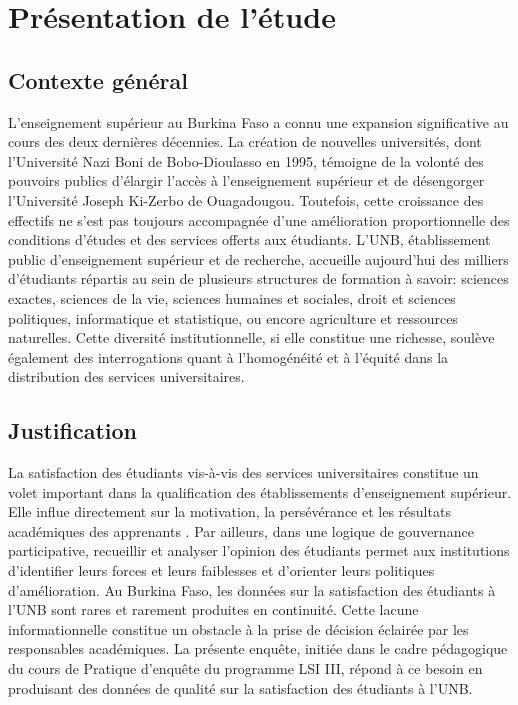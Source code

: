 \documentclass[
12pt,          %
a4paper,       %
oneside,      %
openright      %
]{report}          %
\begin{document}
		
		\chapter{Présentation de l'étude}
		\label{chap:presentation}
		
			\section{Contexte général}
		L'enseignement supérieur au Burkina Faso a connu une expansion significative au cours des
		deux dernières décennies. La création de nouvelles universités, dont l'Université Nazi Boni
		de Bobo-Dioulasso en 1995, témoigne de la volonté des pouvoirs publics d'élargir l'accès
		à l'enseignement supérieur et de désengorger l'Université Joseph Ki-Zerbo de Ouagadougou.
		Toutefois, cette croissance des effectifs ne s'est pas toujours accompagnée d'une amélioration
		proportionnelle des conditions d'études et des services offerts aux étudiants.
		L'UNB, établissement public d'enseignement supérieur et de recherche, accueille aujourd'hui
		des milliers d'étudiants répartis au sein de plusieurs structures de formation à savoir: sciences exactes, sciences de la vie, sciences humaines et sociales,
		droit et sciences politiques, informatique et statistique, ou encore agriculture et
		ressources naturelles. Cette diversité institutionnelle, si elle constitue une richesse,
		soulève également des interrogations quant à l'homogénéité et à l'équité dans la distribution
		des services universitaires.
		
		\section{Justification}
		La satisfaction des étudiants vis-à-vis des services universitaires constitue un volet
		important dans la qualification des établissements d'enseignement supérieur. Elle influe
		directement sur la motivation, la persévérance et les résultats académiques des apprenants
		\citep{elliott2001} \citep{letcher2010}.
		 Par ailleurs, dans une logique de
		gouvernance participative, recueillir et analyser l'opinion des étudiants
		permet aux institutions d'identifier leurs forces et leurs faiblesses et d'orienter leurs
		politiques d'amélioration.
		Au Burkina Faso, les données sur la satisfaction des étudiants à l'UNB sont rares et rarement
		produites en continuité. Cette lacune informationnelle constitue un obstacle à la
		prise de décision éclairée par les responsables académiques. La présente enquête, initiée
		dans le cadre pédagogique du cours de Pratique d'enquête du programme LSI III, répond à ce
		besoin en produisant des données de qualité sur la satisfaction des étudiants à
		l'UNB.
		
\end{document}

